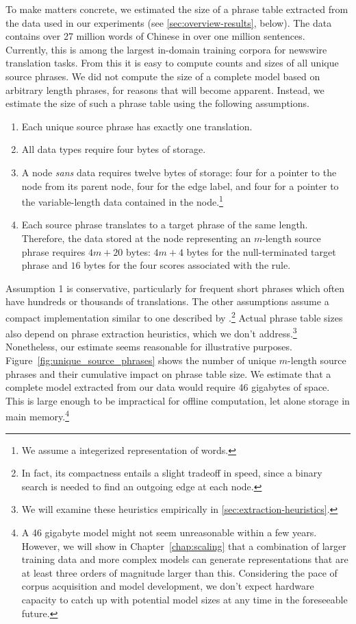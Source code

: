 To make matters concrete, we estimated the size of a phrase
table extracted from the data used in our experiments 
(see \textsection\ref{sec:overview-results}, below).  The data 
contains over 27 million words of Chinese in over one million 
sentences.  Currently, this is among the largest in-domain
training corpora for newswire translation tasks.
From this it is easy to compute counts and sizes
of all unique source phrases.  We did not compute the size of a 
complete model based on arbitrary length phrases, for reasons
that will become apparent.  Instead, we estimate the size of such 
a phrase table using the following assumptions.

\begin{enumerate}
	\item Each unique source phrase has exactly one translation.
	\item All data types require four bytes of storage. 
	\item A node {\em sans} data
		requires twelve bytes of storage: four for a pointer to the node from
		its parent node, four for the edge label, and four for a pointer to the
		variable-length data contained in the node.\footnote{We assume a
		integerized representation of words.}
	\item Each source phrase translates to a target phrase of the same
		length.  Therefore, the data stored at the node
		representing an $m$-length source phrase requires
		$4m+20$ bytes: $4m+4$ bytes for the null-terminated target phrase and
		$16$ bytes for the four scores associated with the rule.
\end{enumerate}

Assumption 1 is conservative, particularly for frequent short phrases
which often have hundreds or thousands of translations.  The other assumptions
assume a compact implementation similar to one described by 
\citet{Zens:2007:hlt-naacl}.\footnote{In fact, its compactness entails a slight
tradeoff in speed, since a binary search is needed to find an outgoing edge
at each node.}  Actual phrase table
sizes also depend on phrase extraction heuristics, which we don't 
address.\footnote{We will examine these heuristics empirically in \textsection\ref{sec:extraction-heuristics}.}
Nonetheless, our estimate seems reasonable for illustrative purposes.
Figure~\ref{fig:unique_source_phrases} shows the number of unique $m$-length
source phrases and their cumulative impact on phrase table size.  We
estimate that a complete model extracted from our data 
would require 46 gigabytes of space.  This is large enough to be
impractical for offline computation, let alone storage in main 
memory.\footnote{A 46 gigabyte model might not seem unreasonable within
a few years.  However, we will show in Chapter~\ref{chap:scaling}
that a combination of larger training data and more 
complex models can generate representations
that are at least three orders of magnitude larger than this.
Considering the pace of corpus acquisition and model development,
we don't expect hardware capacity to catch up with potential model 
sizes at any time in the foreseeable future.}

